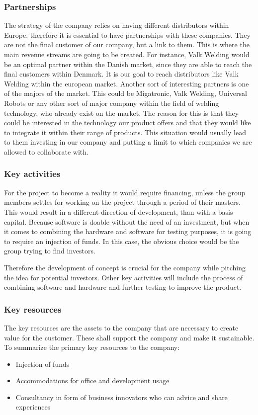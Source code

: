 \subsubsection{Partnerships}
The strategy of the company relies on having different distributors within Europe, therefore it is essential to have partnerships with these companies. They are not the final customer of our company, but a link to them. This is where the main revenue streams are going to be created.
For instance, Valk Welding would be an optimal partner within the Danish market, since they are able to reach the final customers within Denmark. It is our goal to reach distributors like Valk Welding within the european market.
Another sort of interesting partners is one of the majors of the market. This could be Migatronic, Valk Welding, Universal Robots or any other sort of major company within the field of welding technology, who already exist on the market. The reason for this is that they could be interested in the technology our product offers and that they would like to integrate it within their range of products. This situation would usually lead to them investing in our company and putting a limit to which companies we are allowed to collaborate with.

\subsubsection{Key activities}
For the project to become a reality it would require financing, unless the group members settles for working on the project through a period of their masters. This would result in a different direction of development, than with a basis capital. Because software is doable without the need of an investment, but when it comes to combining the hardware and software for testing purposes, it is going to require an injection of funds. In this case, the obvious choice would be the group trying to find investors.

Therefore the development of concept is crucial for the company while pitching the idea for potential investors. Other key activities will include the process of combining software and hardware and further testing to improve the product. 

\subsubsection{Key resources}
The key resources are the assets to the company that are necessary to create value for the customer. These shall support the company and make it sustainable.
To summarize the primary key resources to the company:
\begin{itemize}
\item Injection of funds
\item Accommodations for office and development usage
\item Consultancy in form of business innovators who can advice and share experiences
\end{itemize}

